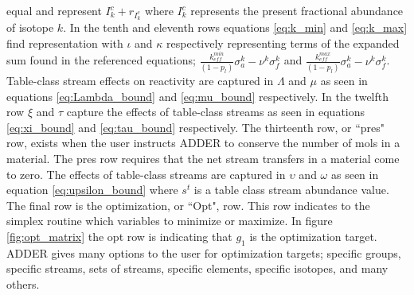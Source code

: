 \documentclass[]{elsarticle}
\begin{document}
equal and represent $I_{k}^{c} + r_{I_{k}^{c}}$ where $I_{k}^{c}$ represents
the present fractional abundance of isotope $k$. In the tenth and eleventh rows
equations \ref{eq:k_min} and \ref{eq:k_max} find representation with $\iota$
and $\kappa$ respectively representing terms of the expanded sum found in the
referenced equations; $\frac{k_{eff}^{min}}{(1-p_{l})} \sigma_{a}^{k} - \nu^{k}
\sigma_{f}^{k}$ and
$\frac{k_{eff}^{max}}{(1-p_{l})} \sigma_{a}^{k} - \nu^{k}
\sigma_{f}^{k}$. Table-class stream effects on reactivity are captured in
$\Lambda$ and $\mu$ as seen in equations \ref{eq:Lambda_bound} and
\ref{eq:mu_bound} respectively. In the twelfth row $\xi$ and $\tau$ capture
the effects of table-class streams as seen in equations \ref{eq:xi_bound} and
\ref{eq:tau_bound} respectively. The thirteenth row, or ``pres" row, exists
when the user instructs ADDER to conserve the number of mols in a material. The
pres row requires that the net stream transfers in a material come to zero. The
effects of table-class streams are captured in $\upsilon$ and $\omega$ as seen
in equation \ref{eq:upsilon_bound} where $s^{t}$ is a table class stream 
abundance value. The final row is the optimization, or ``Opt", row. This row
indicates to the simplex routine which variables to minimize or maximize. In
figure \ref{fig:opt_matrix} the opt row is indicating that $g_{1}$ is the
optimization target. ADDER gives many options to the user for optimization
targets; specific groups, specific streams, sets of streams, specific elements,
specific isotopes, and many others.
\end{document}
